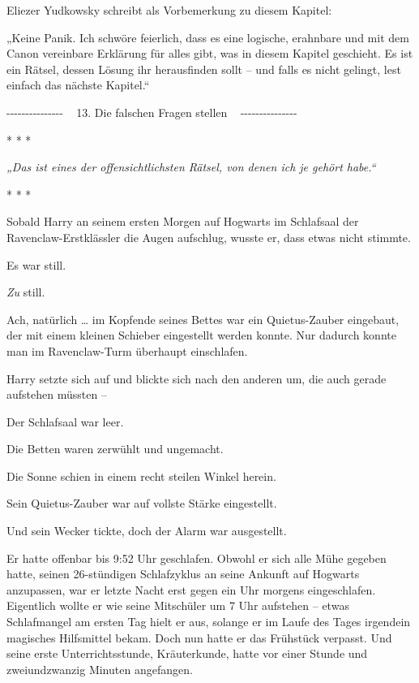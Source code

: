 

\hypertarget{die-falschen-fragen-stellen}{%

Eliezer Yudkowsky schreibt als Vorbemerkung zu diesem Kapitel:

„Keine Panik. Ich schwöre feierlich, dass es eine logische, erahnbare und mit dem Canon vereinbare Erklärung für alles gibt, was in diesem Kapitel geschieht. Es ist ein Rätsel, dessen Lösung ihr herausfinden sollt -- und falls es nicht gelingt, lest einfach das nächste Kapitel.“

-\/-\/-\/-\/-\/-\/-\/-\/-\/-\/-\/-\/-\/-\/- ~ 13. Die falschen Fragen stellen ~ -\/-\/-\/-\/-\/-\/-\/-\/-\/-\/-\/-\/-\/-\/-

* * *

\emph{„Das ist eines der offensichtlichsten Rätsel, von denen ich je gehört habe.“}

* * *

Sobald Harry an seinem ersten Morgen auf Hogwarts im Schlafsaal der Ravenclaw-Erstklässler die Augen aufschlug, wusste er, dass etwas nicht stimmte.

Es war still.

\emph{Zu} still.

Ach, natürlich … im Kopfende seines Bettes war ein Quietus-Zauber eingebaut, der mit einem kleinen Schieber eingestellt werden konnte. Nur dadurch konnte man im Ravenclaw-Turm überhaupt einschlafen.

Harry setzte sich auf und blickte sich nach den anderen um, die auch gerade aufstehen müssten --

Der Schlafsaal war leer.

Die Betten waren zerwühlt und ungemacht.

Die Sonne schien in einem recht steilen Winkel herein.

Sein Quietus-Zauber war auf vollste Stärke eingestellt.

Und sein Wecker tickte, doch der Alarm war ausgestellt.

Er hatte offenbar bis 9:52 Uhr geschlafen. Obwohl er sich alle Mühe gegeben hatte, seinen 26-stündigen Schlafzyklus an seine Ankunft auf Hogwarts anzupassen, war er letzte Nacht erst gegen ein Uhr morgens eingeschlafen. Eigentlich wollte er wie seine Mitschüler um 7 Uhr aufstehen -- etwas Schlafmangel am ersten Tag hielt er aus, solange er im Laufe des Tages irgendein magisches Hilfsmittel bekam. Doch nun hatte er das Frühstück verpasst. Und seine erste Unterrichtsstunde, Kräuterkunde, hatte vor einer Stunde und zweiundzwanzig Minuten angefangen.

}
